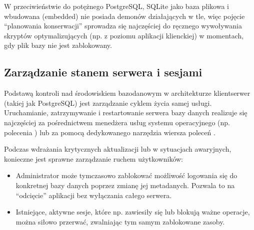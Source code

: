\documentclass[a4paper,11pt,english,openany,oneside]{sphinxmanual}
\begin{document}
\sphinxAtStartPar
{} W przeciwieństwie do potężnego PostgreSQL, SQLite jako baza plikowa i wbudowana (embedded) nie posiada demonów działających w tle, więc pojęcie “planowania konserwacji” sprowadza się najczęściej do ręcznego wywoływania skryptów optymalizujących (np. z poziomu aplikacji klienckiej) w momentach, gdy plik bazy nie jest zablokowany.


\subsection{Zarządzanie stanem serwera i sesjami}
\label{\detokenize{rozdzial_2/rozdzial_23/index:zarzadzanie-stanem-serwera-i-sesjami}}
\sphinxAtStartPar
Podstawą kontroli nad środowiskiem bazodanowym w architekturze klient\sphinxhyphen{}serwer (takiej jak PostgreSQL) jest zarządzanie cyklem życia samej usługi. Uruchamianie, zatrzymywanie i restartowanie serwera bazy danych realizuje się najczęściej za pośrednictwem menedżera usług systemu operacyjnego (np. polecenia ) lub za pomocą dedykowanego narzędzia wiersza poleceń .

\sphinxAtStartPar
Podczas wdrażania krytycznych aktualizacji lub w sytuacjach awaryjnych, konieczne jest sprawne zarządzanie ruchem użytkowników:
\begin{itemize}
\item {} 
\sphinxAtStartPar
{} Administrator może tymczasowo zablokować możliwość logowania się do konkretnej bazy danych poprzez zmianę jej metadanych. Pozwala to na “odcięcie” aplikacji bez wyłączania całego serwera.

\item {} 
\sphinxAtStartPar
{} Istniejące, aktywne sesje, które np. zawiesiły się lub blokują ważne operacje, można siłowo przerwać, zwalniając tym samym zablokowane zasoby.

\end{itemize}

\begin{sphinxVerbatim}[commandchars=\\\{\}]

\end{sphinxVerbatim}
\end{document}
